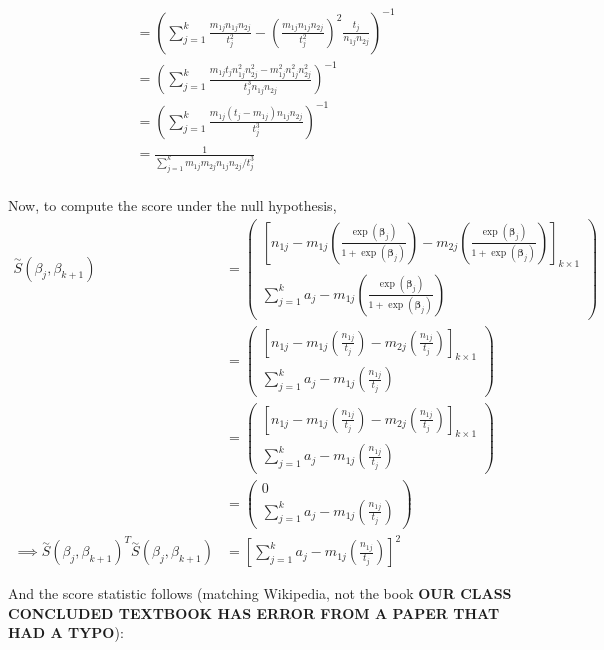 \documentclass[
  letterpaper,
  DIV=11,
  numbers=noendperiod]{scrreprt}
\begin{document}
\[\begin{aligned}
&= \left(\sum_{j=1}^k
\frac{m_{1j}n_{1j}n_{2j}}{t_j^2} - \left(\frac{m_{1j}n_{1j}n_{2j}}{t_j^2}\right)^2\frac{t_j}{n_{1j}n_{2j}}\right)^{-1}\\
&= \left(\sum_{j=1}^k
\frac{m_{1j}t_jn_{1j}^2n_{2j}^2-m_{1j}^2n_{1j}^2n_{2j}^2}{t_j^3n_{1j}n_{2j}}\right)^{-1}\\
&= \left(\sum_{j=1}^k
\frac{m_{1j}(t_j-m_{1j})n_{1j}n_{2j}}{t_j^3}\right)^{-1}\\
&=\frac{1}{\sum_{j=1}^km_{1j}m_{2j}n_{1j}n_{2j}/t_j^3}\\
\end{aligned}
\]

Now, to compute the score under the null hypothesis, \[\begin{aligned}
\overset \sim S(\beta_j, \beta_{k+1})&= \begin{pmatrix}
\left[n_{1j}  -m_{1j}\left(\frac{\exp(\boldsymbol{\beta}_j)}{1+\exp(\boldsymbol{\beta}_j)}\right)
-m_{2j}\left(\frac{\exp(\boldsymbol{\beta}_j)}{1+\exp(\boldsymbol{\beta}_j)}\right) \right]_{k \times 1} \\
\sum_{j=1}^k
a_j-m_{1j}\left(\frac{\exp(\boldsymbol{\beta}_j)}{1+\exp(\boldsymbol{\beta}_j)}\right)
\end{pmatrix} \\
&= \begin{pmatrix}
\left[n_{1j}  -m_{1j}\left(\frac{n_{1j}}{t_j}\right)
-m_{2j}\left(\frac{n_{1j}}{t_j}\right) \right]_{k \times 1} \\
\sum_{j=1}^k
a_j-m_{1j}\left(\frac{n_{1j}}{t_j}\right)
\end{pmatrix} \\
&= \begin{pmatrix}
\left[n_{1j}  -m_{1j}\left(\frac{n_{1j}}{t_j}\right)
-m_{2j}\left(\frac{n_{1j}}{t_j}\right) \right]_{k \times 1} \\
\sum_{j=1}^k a_j-m_{1j}\left(\frac{n_{1j}}{t_j}\right)
\end{pmatrix} \\
&= \begin{pmatrix}0 \\
\sum_{j=1}^k a_j-m_{1j}\left(\frac{n_{1j}}{t_j}\right) \end{pmatrix} \\
\implies \overset \sim S(\beta_j, \beta_{k+1})^T \overset \sim S(\beta_j, \beta_{k+1})&=
\left[\sum_{j=1}^k a_j-m_{1j}\left(\frac{n_{1j}}{t_j}\right)\right]^2
\end{aligned}\]

And the score statistic follows (matching Wikipedia, not the book
\textbf{OUR CLASS CONCLUDED TEXTBOOK HAS ERROR FROM A PAPER THAT HAD A
TYPO}):
\end{document}
